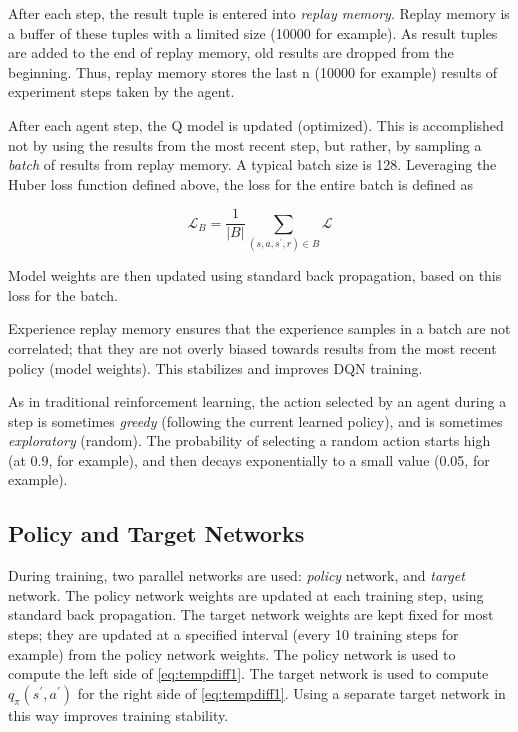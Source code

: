 \documentclass[acmlarge,screen]{acmart}
\begin{document}
After each step, the result tuple is entered into \textit{replay memory}.  
Replay memory is a buffer of these tuples with a limited size (10000 for example).
As result tuples are added to the end of replay memory, old results are dropped from the beginning.
Thus, replay memory stores the last n (10000 for example) results of experiment steps taken by the agent.

After each agent step, the Q model is updated (optimized).
This is accomplished not by using the results from the most recent step, but rather, by sampling a \textit{batch}
of results from replay memory. 
A typical batch size is 128.
Leveraging the Huber loss function defined above, the loss for the entire batch is defined as

\begin{equation}  \label{eq:batchloss}
  \mathcal{L}_B = \frac{1}{\lvert B \rvert} \sum_{ \left( s,a,s^\prime , r \right) \in B}  \mathcal{L}
\end{equation}

\noindent Model weights are then updated using standard back propagation, based on this loss for the batch.

Experience replay memory ensures that the experience samples in a batch are not correlated;
that they are not overly biased towards results from the most recent policy (model weights).
This stabilizes and improves DQN training.

As in traditional reinforcement learning, the action selected by an agent during a step is sometimes 
\textit{greedy} (following the current learned policy), and is sometimes \textit{exploratory} (random).
The probability of selecting a random action starts high (at 0.9, for example), and then decays exponentially to
a small value (0.05, for example).



\subsection{Policy and Target Networks}

During training, two parallel networks are used:  \textit{policy} network, and \textit{target} network.  
The policy network weights are updated at each training step, using standard back propagation.
The target network weights are kept fixed for most steps;  they are updated at a specified interval
(every 10 training steps for example) from the policy network weights.
The policy network is used to compute the left side of \ref{eq:tempdiff1}.  
The target network is used to compute $q_\pi (s^\prime, a^\prime)$ for the right side of \ref{eq:tempdiff1}.  
Using a separate target network in this way improves training stability.
\end{document}
